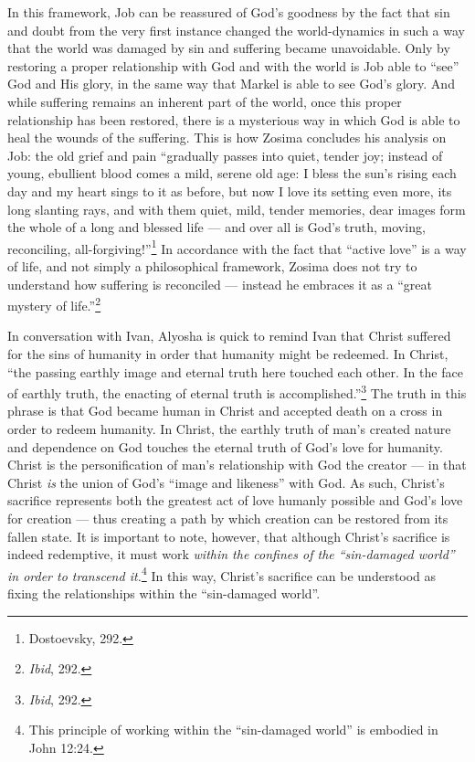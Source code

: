 In this framework, Job can be reassured of God's goodness by the fact that sin and doubt from the very first instance changed the world-dynamics in such a way that the world was damaged by sin and suffering became unavoidable. Only by restoring a proper relationship with God and with the world is Job able to ``see'' God and His glory, in the same way that Markel is able to see God's glory. And while suffering remains an inherent part of the world, once this proper relationship has been restored, there is a mysterious way in which God is able to heal the wounds of the suffering. This is how Zosima concludes his analysis on Job: the old grief and pain ``gradually passes into quiet, tender joy; instead of young, ebullient blood comes a mild, serene old age: I bless the sun's rising each day and my heart sings to it as before, but now I love its setting even more, its long slanting rays, and with them quiet, mild, tender memories, dear images form the whole of a long and blessed life --- and over all is God's truth, moving, reconciling, all-forgiving!''\footnote{Dostoevsky, 292.} In accordance with the fact that ``active love'' is a way of life, and not simply a philosophical framework, Zosima does not try to understand how suffering is reconciled --- instead he embraces it as a ``great mystery of life.''\footnote{\emph{Ibid}, 292.}

In conversation with Ivan, Alyosha is quick to remind Ivan that Christ suffered for the sins of humanity in order that humanity might be redeemed. In Christ, ``the passing earthly image and eternal truth here touched each other. In the face of earthly truth, the enacting of eternal truth is accomplished.''\footnote{\emph{Ibid}, 292.} The truth in this phrase is that God became human in Christ and accepted death on a cross in order to redeem humanity. In Christ, the earthly truth of man's created nature and dependence on God touches the eternal truth of God's love for humanity. Christ is the personification of man's relationship with God the creator --- in that Christ \emph{is} the union of God's ``image and likeness'' with God. As such, Christ's sacrifice represents both the greatest act of love humanly possible and God's love for creation --- thus creating a path by which creation can be restored from its fallen state. It is important to note, however, that although Christ's sacrifice is indeed redemptive, it must work \emph{within the confines of the ``sin-damaged world'' in order to transcend it.}\footnote{This principle of working within the ``sin-damaged world'' is embodied in John 12:24.} In this way, Christ's sacrifice can be understood as fixing the relationships within the ``sin-damaged world''. 

